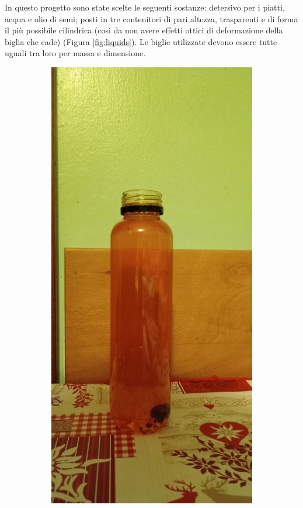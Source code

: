 \documentclass{report} \usepackage[T1]{fontenc} \usepackage[italian]{babel}
\begin{document}
In questo progetto sono state scelte le seguenti sostanze: detersivo per i piatti,
acqua e olio di semi; posti in tre contenitori di pari altezza, trasparenti e di forma
il più possibile cilindrica (così da non avere effetti ottici di deformazione della
biglia che cade) (Figura \ref{fig:liquids}).
Le biglie utilizzate devono essere tutte uguali tra loro per massa e dimensione.
\begin{figure}[H]
\centering
  \begin{subfigure}[b]{0.3\textwidth}
  \includegraphics[width=\textwidth]{detersivo}

\end{subfigure}
\end{figure}
\end{document}
